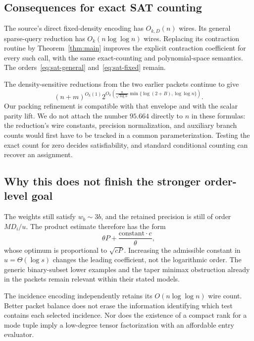 \documentclass[11pt,letterpaper]{article}
\numberwithin{equation}{section}
\theoremstyle{definition}\newtheorem{definition}[theorem]{Definition}
\theoremstyle{remark}\newtheorem{remark}[theorem]{Remark}
\begin{document}
\subsection{Consequences for exact SAT counting}

The source's direct fixed-density encoding has $O_{k,D}(n)$ wires. Its general sparse-query reduction has $O_k(n\log\log n)$ wires. Replacing its contraction routine by Theorem~\ref{thm:main} improves the explicit contraction coefficient for every such call, with the same exact-counting and polynomial-space semantics. The orders~\eqref{eq:sat-general} and~\eqref{eq:sat-fixed} remain.

The density-sensitive reductions from the two earlier packets continue to give
\begin{equation}\label{eq:density-envelope}
 (n+m)^{O_k(1)}
 2^{O_k\!\left(\frac{n}{\sqrt{\log n}}
            \min\{\log(2+B),\log\log n\}\right)}.
\end{equation}
Our packing refinement is compatible with that envelope and with the scalar parity lift. We do not attach the number $95.664$ directly to $n$ in these formulas: the reduction's wire constants, precision normalization, and auxiliary branch counts would first have to be tracked in a common parameterization. Testing the exact count for zero decides satisfiability, and standard conditional counting can recover an assignment.

\subsection{Why this does not finish the stronger order-level goal}

The weights still satisfy $w_b\sim3b$, and the retained precision is still of order $MD_i/u$. The product estimate therefore has the form
\[
 \theta P+\frac{\text{constant}\cdot c}{\theta},
\]
whose optimum is proportional to $\sqrt{cP}$. Increasing the admissible constant in $u=\Theta(\log s)$ changes the leading coefficient, not the logarithmic order. The generic binary-subset lower examples and the taper minimax obstruction already in the packets remain relevant within their stated models.

The incidence encoding independently retains its $O(n\log\log n)$ wire count. Better packet balance does not erase the information identifying which test contains each selected incidence. Nor does the existence of a compact rank for a mode tuple imply a low-degree tensor factorization with an affordable entry evaluator.
\end{document}

